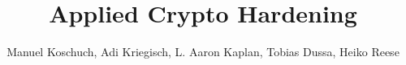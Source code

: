 \documentclass{llncs}
\begin{document}
\title{Applied Crypto Hardening}

\author{ Manuel Koschuch, Adi Kriegisch, L. Aaron Kaplan, Tobias Dussa, Heiko Reese}


\maketitle













\end{document}
